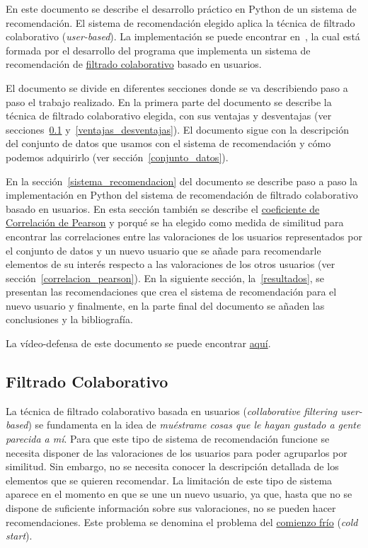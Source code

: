 \documentclass{uimppracticas}
\begin{document}
En este documento se describe el desarrollo práctico en Python de un sistema de recomendación. El sistema de recomendación elegido aplica la técnica de filtrado colaborativo (\textit{user-based}). La implementación se puede encontrar en~\cite{GitHubRepo}, la cual está formada por el desarrollo del programa que implementa un sistema de recomendación de \href{https://es.wikipedia.org/wiki/Filtrado_colaborativo}{filtrado colaborativo} basado en usuarios. 

El documento se divide en diferentes secciones donde se va describiendo paso a paso el trabajo realizado. En la primera parte del documento se describe la técnica de filtrado colaborativo elegida, con sus ventajas y desventajas (ver secciones~\ref{filtro_colaborativo} y~\ref{ventajas_desventajas}). El documento sigue con la descripción del conjunto de datos que usamos con el sistema de recomendación y cómo podemos adquirirlo (ver sección~\ref{conjunto_datos}).

En la sección~\ref{sistema_recomendacion} del documento se describe paso a paso la implementación en Python del sistema de recomendación de filtrado colaborativo basado en usuarios. En esta sección también se describe el \href{https://es.wikipedia.org/wiki/Coeficiente_de_correlaci\%C3\%B3n_de_Pearson}{coeficiente de Correlación de Pearson} y porqué se ha elegido como medida de similitud para encontrar las correlaciones entre las valoraciones de los usuarios representados por el conjunto de datos y un nuevo usuario que se añade para recomendarle elementos de su interés respecto a las valoraciones de los otros usuarios (ver sección~\ref{correlacion_pearson}). En la siguiente sección, la~\ref{resultados}, se presentan las recomendaciones que crea el sistema de recomendación para el nuevo usuario y finalmente, en la parte final del documento se añaden las conclusiones y la bibliografía. 

La vídeo-defensa de este documento se puede encontrar \href{https://drive.google.com/file/d/1fF4ThFMPBNBrg-35KmD29Oj9Q7rNEUVS/view?usp=sharing}{aquí}.

\subsection{Filtrado Colaborativo}\label{filtro_colaborativo}

La técnica de filtrado colaborativo basada en usuarios (\textit{collaborative filtering user-based}) se fundamenta en la idea de \textit{muéstrame cosas que le hayan gustado a gente parecida a mí}. Para que este tipo de sistema de recomendación funcione se necesita disponer de las valoraciones de los usuarios para poder agruparlos por similitud. Sin embargo, no se necesita conocer la descripción detallada de los elementos que se quieren recomendar. La limitación de este tipo de sistema aparece en el momento en que se une un nuevo usuario, ya que, hasta que no se dispone de suficiente información sobre sus valoraciones, no se pueden hacer recomendaciones. Este problema se denomina el problema del \href{https://es.wikipedia.org/wiki/Arranque_en_fr\%C3\%ADo}{comienzo frío} (\textit{cold start}).
\end{document}
